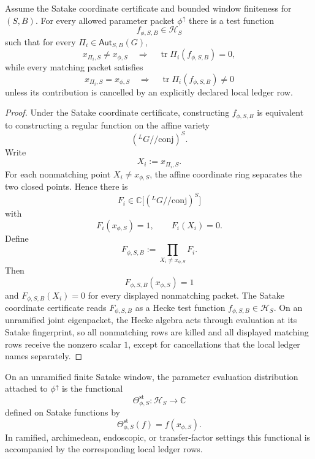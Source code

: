 \begin{theorem}
\label{thm:unified-reality-finite-hecke-projector-cert}
Assume the Satake coordinate certificate and bounded window finiteness
for $(S,B)$. For every allowed parameter packet $\phi^{\uparrow}$ there
is a test function
$$
f_{\phi,S,B}\in\mathcal H_S
$$
such that for every $\Pi_i\in\mathsf{Aut}_{S,B}(G)$,
$$
x_{\Pi_i,S}\ne x_{\phi,S}
\quad\Longrightarrow\quad
\operatorname{tr}\Pi_i(f_{\phi,S,B})=0,
$$
while every matching packet satisfies
$$
x_{\Pi_i,S}=x_{\phi,S}
\quad\Longrightarrow\quad
\operatorname{tr}\Pi_i(f_{\phi,S,B})\ne0
$$
unless its contribution is cancelled by an explicitly declared local
ledger row.
\end{theorem}
\begin{proof}
Under the Satake coordinate certificate, constructing
$f_{\phi,S,B}$ is equivalent to constructing a regular function on the
affine variety
$$
({}^LG/\!/\mathrm{conj})^S.
$$
Write
$$
X_i:=x_{\Pi_i,S}.
$$
For each nonmatching point $X_i\ne x_{\phi,S}$, the affine coordinate
ring separates the two closed points. Hence there is
$$
F_i\in\mathbb C\bigl[({}^LG/\!/\mathrm{conj})^S\bigr]
$$
with
$$
F_i(x_{\phi,S})=1,
\qquad
F_i(X_i)=0.
$$
Define
$$
F_{\phi,S,B}
:=
\prod_{X_i\ne x_{\phi,S}}F_i.
$$
Then
$$
F_{\phi,S,B}(x_{\phi,S})=1
$$
and $F_{\phi,S,B}(X_i)=0$ for every displayed nonmatching packet. The
Satake coordinate certificate reads $F_{\phi,S,B}$ as a Hecke test
function $f_{\phi,S,B}\in\mathcal H_S$. On an unramified joint
eigenpacket, the Hecke algebra acts through evaluation at its Satake
fingerprint, so all nonmatching rows are killed and all displayed
matching rows receive the nonzero scalar $1$, except for cancellations
that the local ledger names separately.
\end{proof}

\begin{definition}
\label{def:unified-reality-parameter-evaluation-distribution}
On an unramified finite Satake window, the parameter evaluation
distribution attached to $\phi^{\uparrow}$ is the functional
$$
\Theta_{\phi,S}^{\mathrm{st}}:\mathcal H_S\to\mathbb C
$$
defined on Satake functions by
$$
\Theta_{\phi,S}^{\mathrm{st}}(f)=f(x_{\phi,S}).
$$
In ramified, archimedean, endoscopic, or transfer-factor settings this
functional is accompanied by the corresponding local ledger rows.
\end{definition}

